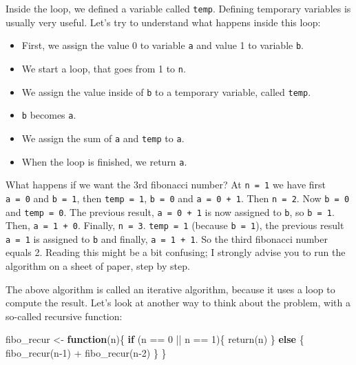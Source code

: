 \documentclass[
]{article}
\newenvironment{Shaded}{\begin{snugshade}}{\end{snugshade}}
\newcommand{\ControlFlowTok}[1]{\textcolor[rgb]{0.13,0.29,0.53}{\textbf{#1}}}
\newcommand{\DecValTok}[1]{\textcolor[rgb]{0.00,0.00,0.81}{#1}}
\newcommand{\FunctionTok}[1]{\textcolor[rgb]{0.00,0.00,0.00}{#1}}
\newcommand{\NormalTok}[1]{#1}
\newcommand{\OtherTok}[1]{\textcolor[rgb]{0.56,0.35,0.01}{#1}}
\newcommand{\SpecialCharTok}[1]{\textcolor[rgb]{0.00,0.00,0.00}{#1}}
\providecommand{\tightlist}{%
  \setlength{\itemsep}{0pt}\setlength{\parskip}{0pt}}
\begin{document}
Inside the loop, we defined a variable called \texttt{temp}. Defining temporary variables is usually very
useful. Let's try to understand what happens inside this loop:

\begin{itemize}
\tightlist
\item
  First, we assign the value 0 to variable \texttt{a} and value 1 to variable \texttt{b}.
\item
  We start a loop, that goes from 1 to \texttt{n}.
\item
  We assign the value inside of \texttt{b} to a temporary variable, called \texttt{temp}.
\item
  \texttt{b} becomes \texttt{a}.
\item
  We assign the sum of \texttt{a} and \texttt{temp} to \texttt{a}.
\item
  When the loop is finished, we return \texttt{a}.
\end{itemize}

What happens if we want the 3rd fibonacci number? At \texttt{n\ =\ 1} we have first \texttt{a\ =\ 0} and \texttt{b\ =\ 1},
then \texttt{temp\ =\ 1}, \texttt{b\ =\ 0} and \texttt{a\ =\ 0\ +\ 1}. Then \texttt{n\ =\ 2}. Now \texttt{b\ =\ 0} and \texttt{temp\ =\ 0}. The previous
result, \texttt{a\ =\ 0\ +\ 1} is now assigned to \texttt{b}, so \texttt{b\ =\ 1}. Then, \texttt{a\ =\ 1\ +\ 0}. Finally, \texttt{n\ =\ 3}. \texttt{temp\ =\ 1} (because \texttt{b\ =\ 1}), the previous result \texttt{a\ =\ 1} is assigned to \texttt{b} and finally, \texttt{a\ =\ 1\ +\ 1}. So
the third fibonacci number equals 2. Reading this might be a bit confusing; I strongly advise you
to run the algorithm on a sheet of paper, step by step.

The above algorithm is called an iterative algorithm, because it uses a loop to compute the result.
Let's look at another way to think about the problem, with a so-called recursive function:

\begin{Shaded}
\begin{Highlighting}[]
\NormalTok{fibo\_recur }\OtherTok{\textless{}{-}} \ControlFlowTok{function}\NormalTok{(n)\{}
 \ControlFlowTok{if}\NormalTok{ (n }\SpecialCharTok{==} \DecValTok{0} \SpecialCharTok{||}\NormalTok{ n }\SpecialCharTok{==} \DecValTok{1}\NormalTok{)\{}
   \FunctionTok{return}\NormalTok{(n)}
\NormalTok{   \} }\ControlFlowTok{else}\NormalTok{ \{}
   \FunctionTok{fibo\_recur}\NormalTok{(n}\DecValTok{{-}1}\NormalTok{) }\SpecialCharTok{+} \FunctionTok{fibo\_recur}\NormalTok{(n}\DecValTok{{-}2}\NormalTok{)}
\NormalTok{   \}}
\NormalTok{\}}
\end{Highlighting}
\end{Shaded}
\end{document}
